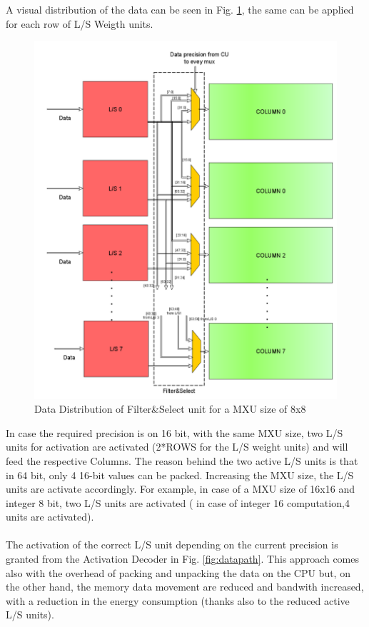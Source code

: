 A visual distribution of the data can be seen in Fig. \ref{fig:fscs}, the same can be applied for each row of L/S Weigth units.
\begin{figure}[H]
\centering
\captionsetup{justification=centering}
\includegraphics[scale=0.5,angle=0]{./figure/filter_and_select.png}
\caption{Data Distribution of Filter\&Select unit for a MXU size of 8x8}
\label{fig:fscs}
\end{figure} 


In case the required precision is on 16 bit, with the same MXU size, two L/S units for activation are activated (2*ROWS for the L/S weight units) and will feed the respective Columns. The reason behind the two active L/S units is that in 64 bit, only 4 16-bit values can be packed.
Increasing the MXU size, the L/S units are activate accordingly. For example, in case of a MXU size of 16x16 and integer 8 bit, two L/S units are activated ( in case of integer 16 computation,4 units are activated).
\\\\
The activation of the correct L/S unit depending on the current precision is granted from the Activation Decoder in Fig. \ref{fig:datapath}.
This approach comes also with the overhead of packing and unpacking the data on the CPU but, on the other hand, the memory data movement are reduced and bandwith increased, with a reduction in the energy consumption (thanks also to the reduced active L/S units).


